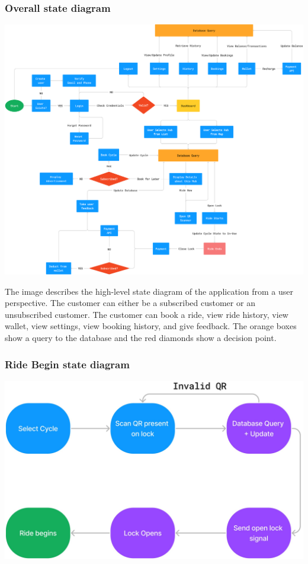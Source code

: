 \documentclass[11pt]{article}
\begin{document}
\subsubsection{Overall state diagram}
\vspace{1cm}
\begin{center}
  \includegraphics[scale=0.105]{state-diagram-images/overall.png}
\end{center}
\vspace{1cm}
The image describes the high-level state diagram of the application from a user perspective. The customer can either be a subscribed customer or an unsubscribed customer. The customer can book a ride, view ride history, view wallet, view settings, view booking history, and give feedback. The orange boxes show a query to the database and the red diamonds show a decision point.

\subsubsection{Ride Begin state diagram}
\begin{center}
  \includegraphics[scale=0.25]{state-diagram-images/ride_begin.jpg}
\end{center}
\end{document}
